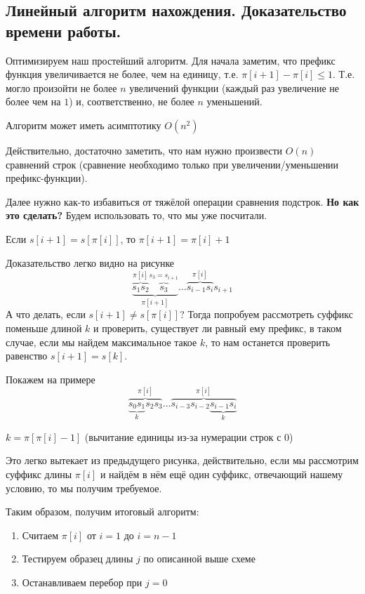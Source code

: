 \subsection{Линейный алгоритм нахождения. Доказательство времени работы.}

Оптимизируем наш простейший алгоритм. Для начала заметим, что префикс функция увеличивается не более, чем
на единицу, т.е. $\pi [i + 1] - \pi [i] \leq 1$. Т.е. могло произойти не более $n$ увеличений функции (каждый
раз увеличение не более чем на $1$) и, соответственно, не более $n$ уменьшений.

\begin{remark}
	Алгоритм может иметь асимптотику $O(n^2)$
\end{remark}
Действительно, достаточно заметить, что нам нужно произвести $O(n)$ сравнений строк (сравнение необходимо только
при увеличении/уменьшении префикс-функции).

Далее нужно как-то избавиться от тяжёлой операции сравнения подстрок. \textbf{Но как это сделать?} Будем
использовать то, что мы уже посчитали.

\begin{remark}
	Если $s[i + 1] = s[\pi [i]]$, то $ \pi [i+1] = \pi [i] + 1$
\end{remark}
Доказательство легко видно на рисунке
\[
	\underbrace{\overbrace{s_1 s_2}^{\pi [i]} \overbrace{s_3}^{s_3 = s_{i+1}}}_{\pi[i+1]} \ldots \overbrace{s_{i-1} s_{i}}^{\pi[i]} s_{i+1} 
\] 
А что делать, если $s[i+1] \neq s[\pi[i]]$? Тогда попробуем рассмотреть суффикс поменьше длиной $k$ и проверить, 
существует ли равный ему префикс, в таком случае, если мы найдем максимальное такое $k$, то нам останется
проверить равенство $s[i+1] = s[k]$.

Покажем на примере
\[
	\overbrace{\underbrace{s_0 s_1}_{k} s_2 s_3}^{\pi [i]} \ldots \overbrace{s_{i-3} s_{i-2} \underbrace{s_{i-1} s_{i}}_{k}}^{\pi [i]}
\] 

\begin{remark}
	$k = \pi[\pi[i] - 1]$ (вычитание единицы из-за нумерации строк с 0)
\end{remark}

Это легко вытекает из предыдущего рисунка, действительно, если мы рассмотрим суффикс длины $\pi [i]$ и найдём 
в нём ещё один суффикс, отвечающий нашему условию, то мы получим требуемое.

Таким образом, получим итоговый алгоритм:

\begin{enumerate}
	\item Считаем $\pi [i]$ от $i = 1$ до $i = n - 1$
	\item Тестируем образец длины $j$ по описанной выше схеме
	\item Останавливаем перебор при $j = 0$
\end{enumerate}

